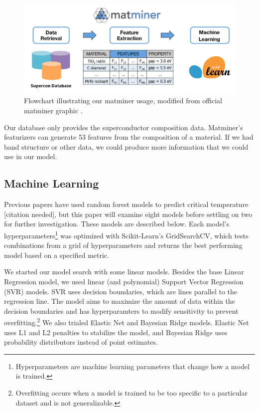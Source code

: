 \documentclass[twocolumn, nofootinbib, secnumarabic, amssymb, nobibnotes, aps, prd]{revtex4-2}
\begin{document}
\begin{figure}[!htb]
   \centering
   \includegraphics[scale=0.25]{flowchart.png}
   \caption{Flowchart illustrating our matminer usage, modified from official matminer graphic \cite{WARD201860}.}
   \label{fig:matminer-flowchart}
\end{figure}

Our database only provides the superconductor composition data. Matminer's featurizers can generate 53 features from the composition of a material. If we had band structure or other data, we could produce more information that we could use in our model.

\subsection{Machine Learning}
Previous papers have used random forest models to predict critical temperature [citation needed], but this paper will examine eight models before settling on two for further investigation. These models are described below. Each model's hyperparameters\footnote{Hyperparameters are machine learning parameters that change how a model is trained.} was optimized with Scikit-Learn's GridSearchCV, which tests combinations from a grid of hyperparameters and returns the best performing model based on a specified metric. 

We started our model search with some linear models. Besides the base Linear Regression model, we used linear (and polynomial) Support Vector Regression (SVR) models. SVR uses decision boundaries, which are lines parallel to the regression line. The model aims to maximize the amount of data within the decision boundaries and has hyperparamters to modify sensitivity to prevent overfitting.\footnote{Overfitting occurs when a model is trained to be too specific to a particular dataset and is not generalizable.} We also trialed Elastic Net and Bayesian Ridge models. Elastic Net uses L1 and L2 penalties to stabilize the model, and Bayesian Ridge uses probability distributors instead of point estimates.
\end{document}
